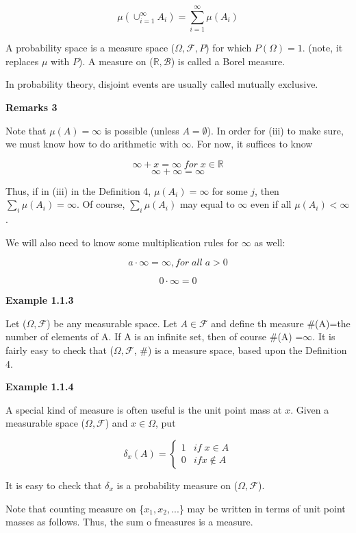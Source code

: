 \documentclass[]{book}
\begin{document}
\[\mu(\cup_{i=1}^\infty A_i)=\sum_{i=1}^\infty \mu(A_i)\]

A probability space is a measure space (\(\Omega, \mathcal{F}, P\)) for
which \(P(\Omega)=1\). (note, it replaces \(\mu\) with \(P\)). A measure
on (\(\mathbb{R}, \mathcal{B}\)) is called a Borel measure.

In probability theory, disjoint events are usually called mutually
exclusive.

\textbf{Remarks 3}

Note that \(\mu(A)=\infty\) is possible (unless \(A=\emptyset\)). In
order for (iii) to make sure, we must know how to do arithmetic with
\(\infty\). For now, it suffices to know

\[\infty+x=\infty \; for \; x \in \mathbb{R}\] \[\infty+\infty=\infty\]

Thus, if in (iii) in the Definition 4, \(\mu(A_i)=\infty\) for some
\(j\), then \(\sum_i \mu(A_i)=\infty\). Of course, \(\sum_i \mu(A_i)\)
may equal to \(\infty\) even if all \(\mu(A_i) < \infty\).

We will also need to know some multiplication rules for \(\infty\) as
well:

\[a \cdot \infty=\infty, for \; all \; a>0\]

\[0 \cdot \infty = 0\]

\textbf{Example 1.1.3}

Let (\(\Omega, \mathcal{F}\)) be any measurable space. Let
\(A \in \mathcal {F}\) and define th measure \#(A)=the number of
elements of A. If A is an infinite set, then of course \#(A)
=\(\infty\). It is fairly easy to check that (\(\Omega, \mathcal{F}\),
\#) is a measure space, based upon the Definition 4.

\textbf{Example 1.1.4}

A special kind of measure is often useful is the unit point mass at
\(x\). Given a measurable space (\(\Omega, \mathcal{F}\)) and
\(x \in \Omega\), put

\[\delta_x(A)=\begin{cases} 1 & if \; x \in  A \\ 0 & if x  \notin  A \end{cases}\]

It is easy to check that \(\delta_x\) is a probability measure on
(\(\Omega, \mathcal{F}\)).

Note that counting measure on \{\(x_1, x_2,...\)\} may be written in
terms of unit point masses as follows. Thus, the sum o fmeasures is a
measure.
\end{document}
